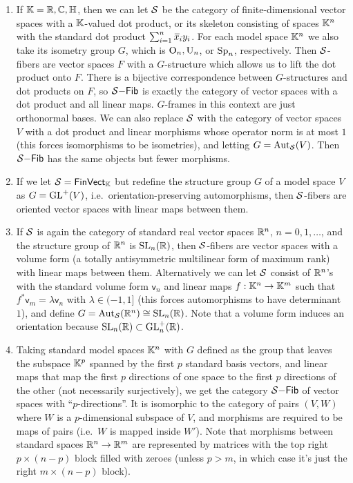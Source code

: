 \begin{example}
\begin{enumerate}
        \item If $\mathbb{K}=\mathbb{R},\mathbb{C},\mathbb{H}$, then we can let $\mathcal{S}$ be the category of finite-dimensional vector spaces with a $\mathbb{K}$-valued dot product, or its skeleton consisting of spaces $\mathbb{K}^n$ with the standard dot product $\sum_{i=1}^n \wb{x}_i y_i$. For each model space $\mathbb{K}^n$ we also take its isometry group $G$, which is $\operatorname{O}_n,\operatorname{U}_n$, or $\operatorname{Sp}_n$, respectively. Then $\mathcal{S}$-fibers are vector spaces $F$ with a $G$-structure which allows us to lift the dot product onto $F$. There is a bijective correspondence between $G$-structures and dot products on $F$, so  $\mathcal{S}\mathsf{-Fib}$ is exactly the category of vector spaces with a dot product and all linear maps. $G$-frames in this context are just orthonormal bases. We can also replace $\mathcal{S}$ with the category of vector spaces $V$ with a dot product and linear morphisms whose operator norm is at most $1$ (this forces isomorphisms to be isometries), and letting $G=\operatorname{Aut}_{\mathcal{S}}(V)$. Then $\mathcal{S}\mathsf{-Fib}$ has the same objects but fewer morphisms.

        \item If we let $\mathcal{S}=\mathsf{FinVect}_{\mathbb{K}}$ but redefine the structure group $G$ of a model space $V$ as $G=\operatorname{GL}^+(V)$, i.e.\ orientation-preserving automorphisms, then $\mathcal{S}$-fibers are oriented vector spaces with linear maps between them. 

        \item If $\mathcal{S}$ is again the category of standard real vector spaces $\mathbb{R}^n$, $n=0,1,\ldots$, and the structure group of $\mathbb{R}^n$ is $\operatorname{SL}_n(\mathbb{R})$, then $\mathcal{S}$-fibers are vector spaces with a volume form (a totally antisymmetric multilinear form of maximum rank) with linear maps between them. Alternatively we can let $\mathcal{S}$ consist of $\mathbb{R}^n$'s with the standard volume form $\mathsf{v}_n$ and linear maps $f:\mathbb{K}^n\to \mathbb{K}^m$ such that $f^\ast \mathsf{v}_m=\lambda \mathsf{v}_n$ with $\lambda\in (-1,1]$ (this forces automorphisms to have determinant $1$), and define $G=\operatorname{Aut}_{\mathcal{S}}(\mathbb{R}^n)\cong \operatorname{SL}_n(\mathbb{R})$. Note that a volume form induces an orientation because $\operatorname{SL}_n(\mathbb{R})\subset \operatorname{GL}_n^+(\mathbb{R})$.

        \item Taking standard model spaces $\mathbb{K}^n$ with $G$ defined as the group that leaves the subspace $\mathbb{K}^p$ spanned by the first $p$ standard basis vectors, and linear maps that map the first $p$ directions of one space to the first $p$ directions of the other (not necessarily surjectively), we get the category $\mathcal{S}\mathsf{-Fib}$ of vector spaces with ``$p$-directions''. It is isomorphic to the category of pairs $(V,W)$ where $W$ is a $p$-dimensional subspace of $V$, and morphisms are required to be maps of pairs (i.e.\ $W$ is mapped inside $W'$). Note that morphisms between standard spaces $\mathbb{R}^n\to \mathbb{R}^m$ are represented by matrices with the top right $p\times(n-p)$ block filled with zeroes (unless $p>m$, in which case it's just the right $m\times (n-p)$ block).


\end{enumerate}
\end{example}
